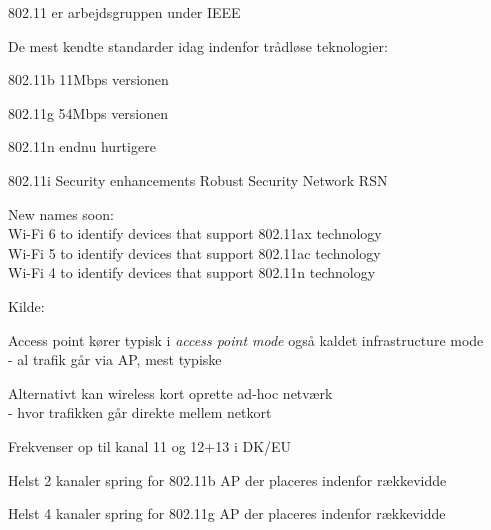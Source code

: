 \documentclass[Screen16to9,17pt]{foils}
\begin{document}

\begin{list1}
\item 802.11 er arbejdsgruppen under IEEE
\item De mest kendte standarder idag indenfor trådløse teknologier:
\begin{list2}
\item 802.11b 11Mbps versionen
\item 802.11g 54Mbps versionen
\item 802.11n endnu hurtigere
\item 802.11i Security enhancements Robust Security Network RSN
\end{list2}
\item New names soon:\\
Wi-Fi 6 to identify devices that support 802.11ax technology\\
Wi-Fi 5 to identify devices that support 802.11ac technology\\
Wi-Fi 4 to identify devices that support 802.11n technology
\end{list1}

Kilde: 


\begin{list1}
\item Access point kører typisk i \emph{access point mode} også kaldet
  infrastructure mode\\
  - al trafik går via AP, mest typiske
\item Alternativt kan wireless kort oprette ad-hoc netværk\\
 - hvor trafikken går direkte mellem netkort
\item Frekvenser op til kanal 11 og 12+13 i DK/EU
\item Helst 2 kanaler spring for 802.11b AP der placeres indenfor rækkevidde
\item Helst 4 kanaler spring for 802.11g AP der placeres indenfor rækkevidde
\end{list1}




\end{document}

